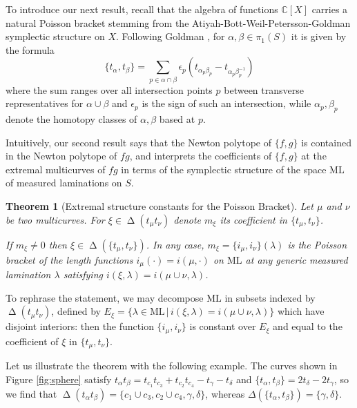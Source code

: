 \documentclass{amsart}
\newtheorem{theoremintro}{Theorem}
\newcommand{\C}{\mathbb{C}}
\newcommand{\ML}{\mathrm{ML}}
\DeclareMathOperator{\NewSet}{\Delta}
\begin{document}
To introduce our next result, recall that the algebra of functions $\C[X]$ carries a natural Poisson bracket stemming from the Atiyah-Bott-Weil-Petersson-Goldman symplectic structure on $X$. Following Goldman  \cite{Goldman_symplectic_1984}, for $\alpha,\beta\in \pi_1(S)$ it is given by the formula 
\begin{equation}\label{goldman}\{t_\alpha,t_\beta\}=\sum_{p\in \alpha\cap \beta}\epsilon_p(t_{\alpha_p\beta_p}-t_{\alpha_p\beta_p^{-1}})
\end{equation}
where the sum ranges over all intersection points $p$ between transverse representatives for $\alpha \cup \beta$ and $\epsilon_p$ is the sign of such an intersection, while $\alpha_p, \beta_p$ denote the homotopy classes of $\alpha, \beta$ based at $p$.

Intuitively, our second result says that the Newton polytope of $\{f,g\}$ is contained in the Newton polytope of $fg$, and interprets the coefficients of $\{f,g\}$ at the extremal multicurves of $fg$ in terms of the symplectic structure of the space $\ML$ of measured laminations on $S$.

\begin{theoremintro}[Extremal structure constants for the Poisson Bracket]
\label{ThmB}
Let $\mu$ and $\nu$ be two multicurves.
%
For $\xi \in \NewSet(t_\mu t_\nu)$ denote $m_\xi$ its coefficient in $\{t_\mu,t_\nu\}$. 

If $m_\xi \ne 0$ then $\xi \in \NewSet(\{t_\mu,t_\nu\})$. In any case,  $m_\xi = \{i_\mu,i_\nu\}(\lambda)$ is the Poisson bracket of the length functions $i_\mu(\cdot)=i(\mu,\cdot)$ on $\ML$ at any generic measured lamination $\lambda$ satisfying $i(\xi, \lambda)=i(\mu\cup\nu, \lambda)$. 
\end{theoremintro}

To rephrase the statement, we may decompose $\ML$ in subsets indexed by $\NewSet(t_\mu t_\nu)$, defined by $E_\xi=\{\lambda\in \ML\,|\, i(\xi, \lambda)=i(\mu\cup\nu, \lambda)\}$ which have disjoint interiors: then the function $\{i_\mu,i_\nu\}$ is constant over $E_\xi$ and equal to the coefficient of $\xi$ in $\{t_\mu,t_\nu\}$. 

Let us illustrate the theorem with the following example. The curves shown in Figure \ref{fig:sphere} satisfy 
$t_\alpha t_\beta=t_{c_1}t_{c_3}+t_{c_2}t_{c_4}-t_{\gamma}-t_{\delta}$ and $\{t_\alpha,t_\beta\}=2t_\delta-2 t_\gamma$, so we find that $\NewSet(t_\alpha t_\beta)=\{c_1\cup c_3,c_2\cup c_4,\gamma,\delta\}$, whereas $\Delta(\{t_\alpha,t_\beta\})=\{\gamma,\delta\}$.
\end{document}
